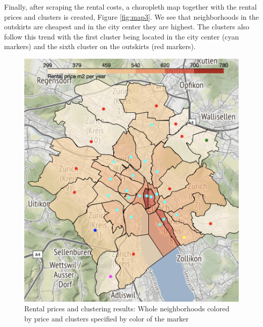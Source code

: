 \documentclass[a4paper,12pt,english]{article}
\begin{document}
Finally, after scraping the rental costs, a choropleth map together with the rental prices and clusters is created, Figure \ref{fig:map3}. We see that neighborhoods in the outskirts are cheapest and in the city center they are highest. The clusters also follow this trend with the first cluster being located in the city center (cyan markers) and the sixth cluster on the outskirts (red markers).


\begin{figure}[h]
\centering
\includegraphics[width=1\linewidth]{map3}
\caption{Rental prices and clustering results: Whole neighborhoods colored by price and clusters specified by color of the marker}
\end{figure}\label{fig:map3}
\end{document}
